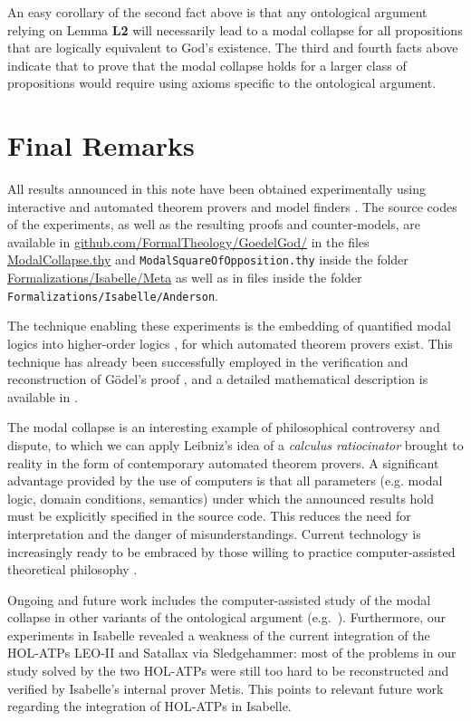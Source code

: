 \documentclass{birkmult}
\theoremstyle{definition}
\theoremstyle{remark}
\numberwithin{equation}{section}
\begin{document}
An easy corollary of the second fact above is that any ontological argument relying on Lemma \textbf{L2} will necessarily lead to a modal collapse for all propositions that are logically equivalent to God's existence. The third and fourth facts above indicate that to prove that the modal collapse holds for a larger class of propositions would require using axioms specific to the ontological argument.




\section{Final Remarks}

\sloppy All results announced in this note have been 
obtained experimentally using interactive and 
automated theorem provers and model finders
\cite{LEO,Satallax,Isabelle,Coq,Nitpick}.  
The source codes of the experiments, 
as well as the resulting proofs and counter-models, 
are available in
\url{github.com/FormalTheology/GoedelGod/}
in the files \url{ModalCollapse.thy} and \texttt{ModalSquareOfOpposition.thy} inside the folder \url{Formalizations/Isabelle/Meta} as well as in files inside the folder \texttt{Formalizations/Isabelle/Anderson}.

The technique enabling these experiments is the embedding of 
quantified modal logics into higher-order logics 
\cite{J23,B9,C36}, for which automated theorem provers exist. 
This technique has already been successfully employed in the 
verification and reconstruction of G\"odel's proof 
\cite{J28,J30,W50,J29}, and a detailed 
mathematical description is available in \cite{C40}.

The modal collapse is an interesting example of philosophical 
controversy and dispute, to which we can apply Leibniz's idea 
of a \emph{calculus ratiocinator} brought to reality in the 
form of contemporary automated theorem provers. 
A significant advantage provided by the use of computers is 
that all parameters (e.g. modal logic, domain conditions, 
semantics) under which the announced results hold must be 
explicitly specified in the source code. This reduces the need 
for interpretation and the danger of misunderstandings. 
Current technology is increasingly ready to be embraced by 
those willing to practice computer-assisted theoretical 
philosophy \cite{oppenheimera11,rushby13}.

Ongoing and future work includes the computer-assisted 
study of the modal collapse in
other variants of the ontological argument (e.g.~\cite{bjordal99,fuhrmann05:_exist_notwen}). Furthermore, our experiments in Isabelle revealed a weakness of the current integration of the HOL-ATPs LEO-II and Satallax via Sledgehammer: most of the problems in our study solved by the two HOL-ATPs were still too hard to be reconstructed and verified by Isabelle's internal prover Metis. This points to relevant future work regarding the integration of HOL-ATPs in Isabelle.
 
\end{document}
